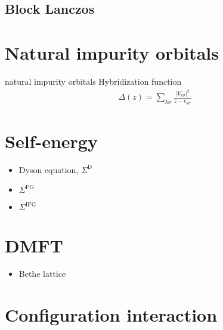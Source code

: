\subsection{Block Lanczos}

\section{Natural impurity orbitals}

natural impurity orbitals
Hybridization function
\begin{align}
    \Delta(z) = \sum_{k\sigma} \frac{|V_{k\sigma}|^2}{z - \epsilon_{k\sigma}}
\end{align}

\section{Self-energy}

\begin{itemize}
    \item Dyson equation, $\Sigma^\mathrm{D}$
    \item $\Sigma^\mathrm{FG}$
    \item $\Sigma^\mathrm{IFG}$
\end{itemize}

\section{DMFT}

\begin{itemize}
    \item Bethe lattice
\end{itemize}

\section{Configuration interaction}
